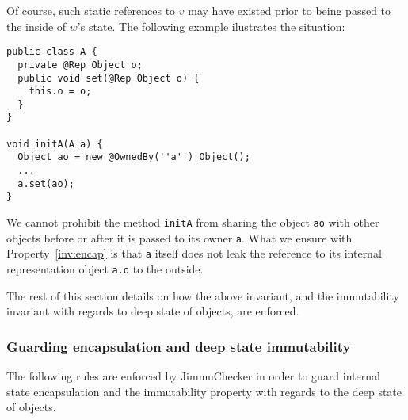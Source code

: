 \documentclass{pracamgr}
\theoremstyle{break}
\theoremstyle{break}
\theoremstyle{break}
\begin{document}
Of course, such static references to $v$ may have existed prior to
being passed to the inside of $w$'s state. The following example
ilustrates the situation:

\begin{lstlisting}
public class A {
  private @Rep Object o;
  public void set(@Rep Object o) {
    this.o = o;
  }
}

void initA(A a) {
  Object ao = new @OwnedBy(''a'') Object();
  ...
  a.set(ao);
}
\end{lstlisting}

We cannot prohibit the method \texttt{initA} from sharing the object
\texttt{ao} with other objects before or after it is passed to its
owner \texttt{a}. What we ensure with Property~\ref{inv:encap} is that
\texttt{a} itself does not leak the reference to its internal
representation object \texttt{a.o} to the outside.

The rest of this section details on how the above invariant, and the
immutability invariant with regards to deep state of objects, are
enforced.

\subsubsection{Guarding encapsulation and deep state immutability} 

The following rules are enforced by JimmuChecker in order to guard
internal state encapsulation and the immutability property with
regards to the deep state of objects.
\end{document}

